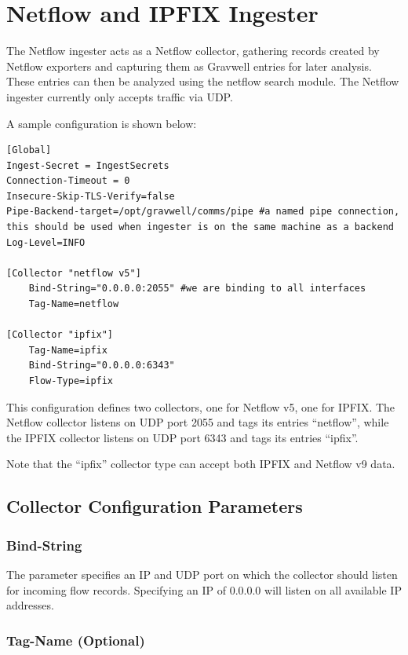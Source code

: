 \section{Netflow and IPFIX Ingester}

The Netflow ingester acts as a Netflow collector, gathering records
created by Netflow exporters and capturing them as Gravwell entries for
later analysis. These entries can then be analyzed using the netflow
search module. The Netflow ingester currently only accepts traffic via
UDP.

A sample configuration is shown below:

\begin{Verbatim}[breaklines=true]
[Global]
Ingest-Secret = IngestSecrets
Connection-Timeout = 0
Insecure-Skip-TLS-Verify=false
Pipe-Backend-target=/opt/gravwell/comms/pipe #a named pipe connection, this should be used when ingester is on the same machine as a backend
Log-Level=INFO

[Collector "netflow v5"]
    Bind-String="0.0.0.0:2055" #we are binding to all interfaces
    Tag-Name=netflow

[Collector "ipfix"]
    Tag-Name=ipfix
    Bind-String="0.0.0.0:6343"
    Flow-Type=ipfix
\end{Verbatim}

This configuration defines two collectors, one for Netflow v5, one for
IPFIX. The Netflow collector listens on UDP port 2055 and tags its
entries ``netflow'', while the IPFIX collector listens on UDP port 6343
and tags its entries ``ipfix''.

Note that the ``ipfix'' collector type can accept both IPFIX and Netflow v9 data.

\subsection{Collector Configuration Parameters}

\subsubsection{Bind-String}

The  parameter specifies an IP and UDP port on which
the collector should listen for incoming flow records. Specifying an IP
of 0.0.0.0 will listen on all available IP addresses.

\subsubsection{Tag-Name (Optional)}

